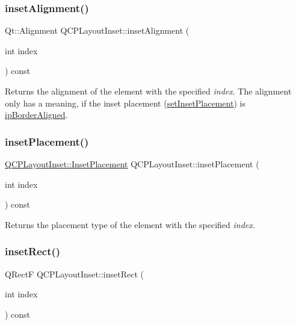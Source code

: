 \subsubsection{\texorpdfstring{inset\+Alignment()}{insetAlignment()}}
{\footnotesize\ttfamily Qt\+::\+Alignment Q\+C\+P\+Layout\+Inset\+::inset\+Alignment (\begin{DoxyParamCaption}\item[{int}]{index }\end{DoxyParamCaption}) const}

Returns the alignment of the element with the specified {\itshape index}. The alignment only has a meaning, if the inset placement (\hyperlink{classQCPLayoutInset_a63298830744d5d8c5345511c00fd2144}{set\+Inset\+Placement}) is \hyperlink{classQCPLayoutInset_a8b9e17d9a2768293d2a7d72f5e298192aa81e7df4a785ddee2229a8f47c46e817}{ip\+Border\+Aligned}. \mbox{\label{classQCPLayoutInset_a6fcbd74ebbc45bfe64c604b2791aa57f}} 
\subsubsection{\texorpdfstring{inset\+Placement()}{insetPlacement()}}
{\footnotesize\ttfamily \hyperlink{classQCPLayoutInset_a8b9e17d9a2768293d2a7d72f5e298192}{Q\+C\+P\+Layout\+Inset\+::\+Inset\+Placement} Q\+C\+P\+Layout\+Inset\+::inset\+Placement (\begin{DoxyParamCaption}\item[{int}]{index }\end{DoxyParamCaption}) const}

Returns the placement type of the element with the specified {\itshape index}. \mbox{\label{classQCPLayoutInset_ab23099a46af17c31f4c40668f13c9de1}} 
\subsubsection{\texorpdfstring{inset\+Rect()}{insetRect()}}
{\footnotesize\ttfamily Q\+RectF Q\+C\+P\+Layout\+Inset\+::inset\+Rect (\begin{DoxyParamCaption}\item[{int}]{index }\end{DoxyParamCaption}) const}

